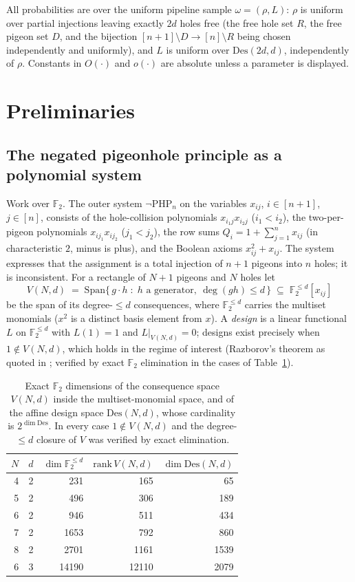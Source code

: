 \documentclass[11pt]{article}
\theoremstyle{definition}
\theoremstyle{remark}
\newcommand{\F}{\mathbb{F}}
\newcommand{\PHPn}{\neg\mathrm{PHP}_n}
\newcommand{\Des}{\mathrm{Des}}
\newcommand{\Sp}{\mathrm{Span}}
\begin{document}
All probabilities are over the uniform pipeline sample $\omega=(\rho,L)$:
$\rho$ is uniform over partial injections leaving exactly $2d$ holes free
(the free hole set $R$, the free pigeon set $D$, and the bijection
$[n+1]\setminus D\to[n]\setminus R$ being chosen independently and
uniformly), and $L$ is uniform over $\Des(2d,d)$, independently of
$\rho$.  Constants in $O(\cdot)$ and $o(\cdot)$ are absolute unless a
parameter is displayed.

\section{Preliminaries}\label{sec:prelim}

\subsection{The negated pigeonhole principle as a polynomial system}

Work over $\F_2$.  The outer system $\PHPn$ on the variables $x_{ij}$,
$i\in[n+1]$, $j\in[n]$, consists of the hole-collision polynomials
$x_{i_1j}x_{i_2j}$ ($i_1<i_2$), the two-per-pigeon polynomials
$x_{ij_1}x_{ij_2}$ ($j_1<j_2$), the row sums
$Q_i=1+\sum_{j=1}^n x_{ij}$ (in characteristic $2$, minus is plus), and
the Boolean axioms $x_{ij}^2+x_{ij}$.  The system expresses that the
assignment is a total injection of $n+1$ pigeons into $n$ holes; it is
inconsistent.  For a rectangle of $N+1$ pigeons and $N$ holes let
\[
V(N,d)\;=\;\Sp\bigl\{\,g\cdot h \;:\; h \text{ a generator},\ \deg(gh)\le
d\,\bigr\}\;\subseteq\;\F_2^{\le d}[x_{ij}]
\]
be the span of its degree-$\le d$ consequences, where $\F_2^{\le d}$
carries the multiset monomials ($x^2$ is a distinct basis element from
$x$).  A \emph{design} is a linear functional $L$ on $\F_2^{\le d}$ with
$L(1)=1$ and $L|_{V(N,d)}=0$; designs exist precisely when
$1\notin V(N,d)$, which holds in the regime of interest (Razborov's
theorem as quoted in \cite{Kra26}; verified by exact $\F_2$ elimination
in the cases of Table~\ref{tab:dims}).

\begin{table}[t]
\centering
\begin{tabular}{rrrrr}
\hline
$N$ & $d$ & $\dim \F_2^{\le d}$ & $\mathrm{rank}\,V(N,d)$ &
$\dim\Des(N,d)$\\
\hline
4 & 2 & 231 & 165 & 65\\
5 & 2 & 496 & 306 & 189\\
6 & 2 & 946 & 511 & 434\\
7 & 2 & 1653 & 792 & 860\\
8 & 2 & 2701 & 1161 & 1539\\
6 & 3 & 14190 & 12110 & 2079\\
\hline
\end{tabular}
\caption{Exact $\F_2$ dimensions of the consequence space $V(N,d)$ inside
the multiset-monomial space, and of the affine design space
$\Des(N,d)$, whose cardinality is $2^{\dim\Des}$.  In every case
$1\notin V(N,d)$ and the degree-$\le d$ closure of $V$ was verified by
exact elimination.}
\label{tab:dims}
\end{table}
\end{document}
